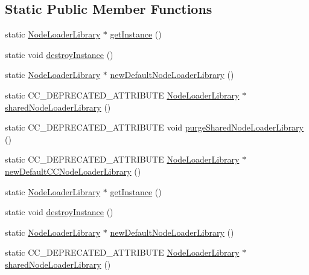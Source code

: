 \subsection*{Static Public Member Functions}
\begin{DoxyCompactItemize}
\item 
static \hyperlink{classcocosbuilder_1_1NodeLoaderLibrary}{Node\+Loader\+Library} $\ast$ \hyperlink{classcocosbuilder_1_1NodeLoaderLibrary_a9ce06c11d4c7c34bf07be95ed58e9830}{get\+Instance} ()
\item 
static void \hyperlink{classcocosbuilder_1_1NodeLoaderLibrary_aea2f28cd5fb0355c6857b62537a2b12a}{destroy\+Instance} ()
\item 
static \hyperlink{classcocosbuilder_1_1NodeLoaderLibrary}{Node\+Loader\+Library} $\ast$ \hyperlink{classcocosbuilder_1_1NodeLoaderLibrary_a16b6a0ee23aec36860713800d912b8f2}{new\+Default\+Node\+Loader\+Library} ()
\item 
static C\+C\+\_\+\+D\+E\+P\+R\+E\+C\+A\+T\+E\+D\+\_\+\+A\+T\+T\+R\+I\+B\+U\+TE \hyperlink{classcocosbuilder_1_1NodeLoaderLibrary}{Node\+Loader\+Library} $\ast$ \hyperlink{classcocosbuilder_1_1NodeLoaderLibrary_a3d0a5cd5c528eb69b8a4d8709ac4cb1a}{shared\+Node\+Loader\+Library} ()
\item 
static C\+C\+\_\+\+D\+E\+P\+R\+E\+C\+A\+T\+E\+D\+\_\+\+A\+T\+T\+R\+I\+B\+U\+TE void \hyperlink{classcocosbuilder_1_1NodeLoaderLibrary_a073ae9ba071000f0c2b93ea1b049474e}{purge\+Shared\+Node\+Loader\+Library} ()
\item 
static C\+C\+\_\+\+D\+E\+P\+R\+E\+C\+A\+T\+E\+D\+\_\+\+A\+T\+T\+R\+I\+B\+U\+TE \hyperlink{classcocosbuilder_1_1NodeLoaderLibrary}{Node\+Loader\+Library} $\ast$ \hyperlink{classcocosbuilder_1_1NodeLoaderLibrary_a565251dc670e03fced0d284b2190a7bc}{new\+Default\+C\+C\+Node\+Loader\+Library} ()
\item 
static \hyperlink{classcocosbuilder_1_1NodeLoaderLibrary}{Node\+Loader\+Library} $\ast$ \hyperlink{classcocosbuilder_1_1NodeLoaderLibrary_a2e11d16961b9509f5f5c2af1046419c0}{get\+Instance} ()
\item 
static void \hyperlink{classcocosbuilder_1_1NodeLoaderLibrary_a8a42e37bd95ef9edf2319e8da9404ef3}{destroy\+Instance} ()
\item 
static \hyperlink{classcocosbuilder_1_1NodeLoaderLibrary}{Node\+Loader\+Library} $\ast$ \hyperlink{classcocosbuilder_1_1NodeLoaderLibrary_af41fff3d14516157e76fba726a2ec62c}{new\+Default\+Node\+Loader\+Library} ()
\item 
static C\+C\+\_\+\+D\+E\+P\+R\+E\+C\+A\+T\+E\+D\+\_\+\+A\+T\+T\+R\+I\+B\+U\+TE \hyperlink{classcocosbuilder_1_1NodeLoaderLibrary}{Node\+Loader\+Library} $\ast$ \hyperlink{classcocosbuilder_1_1NodeLoaderLibrary_a3d0a5cd5c528eb69b8a4d8709ac4cb1a}{shared\+Node\+Loader\+Library} ()

\end{DoxyCompactItemize}
